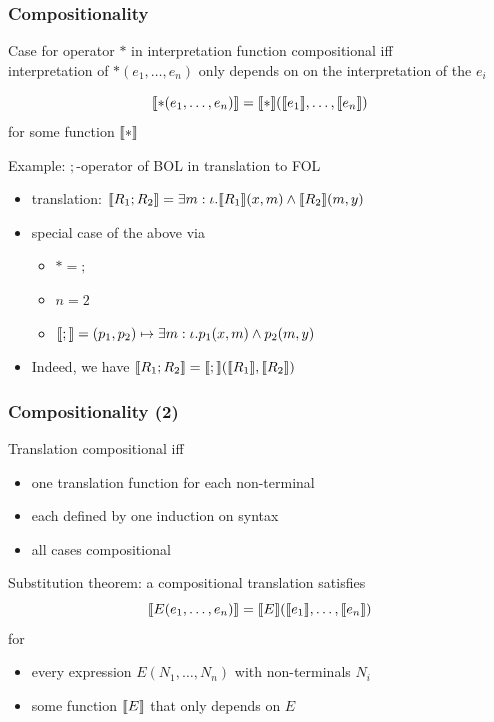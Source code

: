 \begin{frame}\frametitle{Compositionality}
Case for operator $*$ in interpretation function compositional iff \\
interpretation of $*(e_1,\ldots,e_n)$ only depends on on the interpretation of the $e_i$

\[\llbracket *(e_1,\ldots,e_n)\rrbracket=\llbracket *\rrbracket(\llbracket e_1\rrbracket,\ldots,\llbracket e_n\rrbracket)\]
for some function $\llbracket *\rrbracket$
\bigskip

Example: $;$-operator of BOL in translation to FOL
\begin{itemize}
 \item translation: $\llbracket R_1 ; R_2\rrbracket= \exists m:\iota.\llbracket R_1\rrbracket(x,m)\wedge \llbracket R_2\rrbracket(m,y)$
 \item special case of the above via
  \begin{itemize}
  \item $*=;$
  \item $n=2$
  \item $\llbracket ;\rrbracket=(p_1,p_2)\mapsto \exists m:\iota.p_1(x,m)\wedge p_2(m,y)$
  \end{itemize}
 \item Indeed, we have $\llbracket R_1;R_2\rrbracket=\llbracket ;\rrbracket(\llbracket R_1\rrbracket,\llbracket R_2\rrbracket)$
\end{itemize}
\end{frame}


\begin{frame}\frametitle{Compositionality (2)}
Translation compositional iff
\begin{itemize}
\item one translation function for each non-terminal
\item each defined by one induction on syntax
\item all cases compositional
\end{itemize}
\bigskip

Substitution theorem: a compositional translation satisfies
\[\llbracket E(e_1,\ldots,e_n)\rrbracket=\llbracket E\rrbracket(\llbracket e_1\rrbracket,\ldots,\llbracket e_n\rrbracket)\]
for
\begin{itemize}
\item every expression $E(N_1,\ldots,N_n)$ with non-terminals $N_i$
\item some function $\llbracket E\rrbracket$ that only depends on $E$
\end{itemize}
\end{frame}


